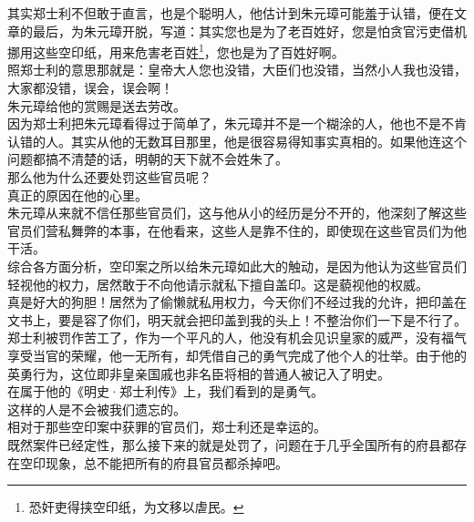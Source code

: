 \begin{multicols}{\theparacolNo}
其实郑士利不但敢于直言，也是个聪明人，他估计到朱元璋可能羞于认错，便在文章的最后，为朱元璋开脱，写道：其实您也是为了老百姓好，您是怕贪官污吏借机挪用这些空印纸，用来危害老百姓\footnote{恐奸吏得挟空印纸，为文移以虐民。}，您也是为了百姓好啊。\\

照郑士利的意思那就是：皇帝大人您也没错，大臣们也没错，当然小人我也没错，大家都没错，误会，误会啊！\\

朱元璋给他的赏赐是送去劳改。\\

因为郑士利把朱元璋看得过于简单了，朱元璋并不是一个糊涂的人，他也不是不肯认错的人。其实从他的无数耳目那里，他是很容易得知事实真相的。如果他连这个问题都搞不清楚的话，明朝的天下就不会姓朱了。\\

那么他为什么还要处罚这些官员呢？\\

真正的原因在他的心里。\\

朱元璋从来就不信任那些官员们，这与他从小的经历是分不开的，他深刻了解这些官员们营私舞弊的本事，在他看来，这些人是靠不住的，即使现在这些官员们为他干活。\\

综合各方面分析，空印案之所以给朱元璋如此大的触动，是因为他认为这些官员们轻视他的权力，居然敢于不向他请示就私下擅自盖印。这是藐视他的权威。\\

真是好大的狗胆！居然为了偷懒就私用权力，今天你们不经过我的允许，把印盖在文书上，要是容了你们，明天就会把印盖到我的头上！不整治你们一下是不行了。\\

郑士利被罚作苦工了，作为一个平凡的人，他没有机会见识皇家的威严，没有福气享受当官的荣耀，他一无所有，却凭借自己的勇气完成了他个人的壮举。由于他的英勇行为，这位即非皇亲国戚也非名臣将相的普通人被记入了明史。\\

在属于他的《明史·郑士利传》上，我们看到的是勇气。\\

这样的人是不会被我们遗忘的。\\

相对于那些空印案中获罪的官员们，郑士利还是幸运的。\\

既然案件已经定性，那么接下来的就是处罚了，问题在于几乎全国所有的府县都存在空印现象，总不能把所有的府县官员都杀掉吧。\\


\end{multicols}
